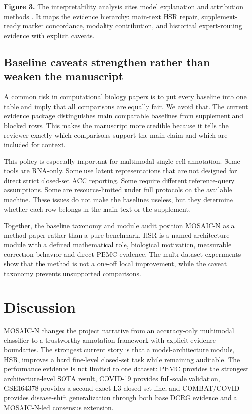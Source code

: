 \documentclass[unnumsec,webpdf,contemporary,large,numbered]{oup-authoring-template}
\begin{document}
\noindent\textbf{Figure 3.}
The interpretability analysis cites model explanation and attribution methods \citep{ribeiro2016,sundararajan2017,montavon2019,lundberg2017,samek2021}. It maps the evidence hierarchy: main-text HSR repair, supplement-ready marker concordance, modality contribution, and historical expert-routing evidence with explicit caveats.

\subsection{Baseline caveats strengthen rather than weaken the manuscript}

A common risk in computational biology papers is to put every baseline into one table and imply that all comparisons are equally fair. We avoid that. The current evidence package distinguishes main comparable baselines from supplement and blocked rows. This makes the manuscript more credible because it tells the reviewer exactly which comparisons support the main claim and which are included for context.

This policy is especially important for multimodal single-cell annotation. Some tools are RNA-only. Some use latent representations that are not designed for direct strict closed-set ACC reporting. Some require different reference-query assumptions. Some are resource-limited under full protocols on the available machine. These issues do not make the baselines useless, but they determine whether each row belongs in the main text or the supplement.

Together, the baseline taxonomy and module audit position MOSAIC-N as a method paper rather than a pure benchmark. HSR is a named architecture module with a defined mathematical role, biological motivation, measurable correction behavior and direct PBMC evidence. The multi-dataset experiments show that the method is not a one-off local improvement, while the caveat taxonomy prevents unsupported comparisons.

\section{Discussion}

MOSAIC-N changes the project narrative from an accuracy-only multimodal classifier to a trustworthy annotation framework with explicit evidence boundaries. The strongest current story is that a model-architecture module, HSR, improves a hard fine-level closed-set task while remaining auditable. The performance evidence is not limited to one dataset: PBMC provides the strongest architecture-level SOTA result, COVID-19 provides full-scale validation, GSE164378 provides a second exact-L3 closed-set line, and COMBAT/COVID provides disease-shift generalization through both base DCRG evidence and a MOSAIC-N-led consensus extension.
\end{document}
